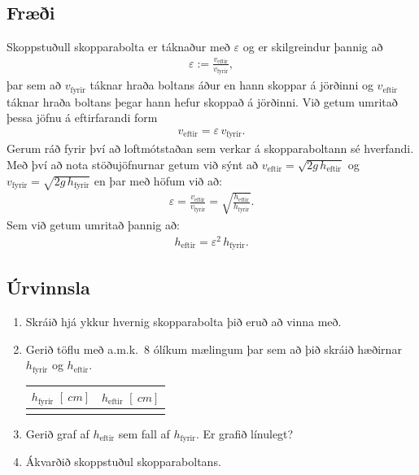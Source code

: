 \documentclass[oneside]{book}
\theoremstyle{definition}
\begin{document}
\subsection*{Fræði}


Skoppstuðull skopparabolta er táknaður með $\varepsilon$ og er skilgreindur þannig að
\begin{align*}
    \varepsilon := \frac{v_\text{eftir}}{v_{\text{fyrir}}},
\end{align*}
þar sem að $v_{\text{fyrir}}$ táknar hraða boltans áður en hann skoppar á jörðinni og $v_{\text{eftir}}$ táknar hraða boltans þegar hann hefur skoppað á jörðinni. Við getum umritað þessa jöfnu á eftirfarandi form
\begin{align*}
    v_\text{eftir} = \varepsilon \, v_{\text{fyrir}}.
\end{align*}
Gerum ráð fyrir því að loftmótstaðan sem verkar á skopparaboltann sé hverfandi. Með því að nota stöðujöfnurnar getum við sýnt að $v_\text{eftir} = \sqrt{2g \, h_\text{eftir}}$ og $v_\text{fyrir} = \sqrt{2g \, h_\text{fyrir}}$ en þar með höfum við að:
\begin{align*}
    \varepsilon = \frac{v_\text{eftir}}{v_{\text{fyrir}}} = \sqrt{\frac{h_\text{eftir}}{h_\text{fyrir}}}.
\end{align*}
Sem við getum umritað þannig að:
\begin{align*}
    h_\text{eftir} = \varepsilon^2 \, h_\text{fyrir}.
\end{align*}



\subsection*{Úrvinnsla}

\begin{enumerate}[label = (\roman*)]
    \item Skráið hjá ykkur hvernig skopparabolta þið eruð að vinna með.
    
    \item Gerið töflu með a.m.k.~8 ólíkum mælingum þar sem að þið skráið hæðirnar $h_\text{fyrir}$ og $h_\text{eftir}$.

\begin{table}[H]
    \centering
    \begin{tabular}{|c|c|}
    \hline
       $h_\text{fyrir} \, \, [\SI{}{cm}]$  & $h_\text{eftir} \, \, [\SI{}{cm}]$    \\ \hline
       & \\\hline
    \end{tabular}
\end{table}

\item Gerið graf af $h_\text{eftir}$ sem fall af $h_\text{fyrir}$. Er grafið línulegt?

\item Ákvarðið skoppstuðul skopparaboltans.
\end{enumerate}
\end{document}
